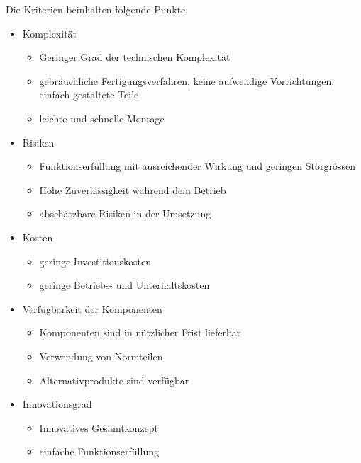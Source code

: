 Die Kriterien beinhalten folgende Punkte:
\begin{itemize}
	\item Komplexität
	\begin{itemize}
		\item Geringer Grad der technischen Komplexität
		
		\item gebräuchliche Fertigungsverfahren, keine aufwendige Vorrichtungen, einfach gestaltete Teile
		
		\item leichte und schnelle Montage
	\end{itemize}

	\item Risiken
	\begin{itemize}
	\item Funktionserfüllung mit ausreichender Wirkung und geringen Störgrössen
	
	\item Hohe Zuverlässigkeit während dem Betrieb
	
	\item abschätzbare Risiken in der Umsetzung
	\end{itemize}

	\item Kosten
	\begin{itemize}
	\item geringe Investitionskosten
	
	\item geringe Betriebs- und Unterhaltskosten
	\end{itemize}

	\item Verfügbarkeit der Komponenten
	\begin{itemize}
	\item Komponenten sind in nützlicher Frist lieferbar
	
	\item Verwendung von Normteilen
	
	\item Alternativprodukte sind verfügbar
	\end{itemize}

	\item Innovationsgrad
	\begin{itemize}
	\item Innovatives Gesamtkonzept
	
	\item einfache Funktionserfüllung
	

\end{itemize}
\end{itemize}
